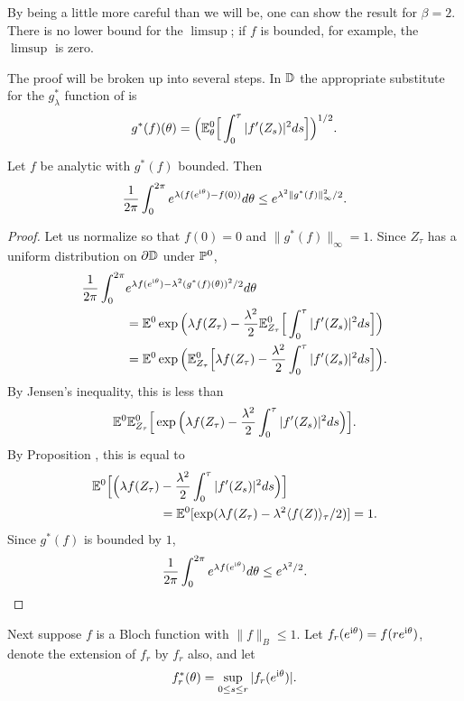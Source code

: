 By being a little more careful than we will be, one can show the result for $\beta = 2$. There is no lower bound for the $\limsup$; if $f$ is bounded, for example, the $\limsup$ is zero.

The proof will be broken up into several steps. In $\D$ the appropriate substitute for the $g_\lambda^*$ function of  is
\[
    g^*(f)(\theta) = \Big(\E_\theta^0\Big[\int_0^\tau |f'(Z_s)|^2 ds\Big]\Big)^{1/2}.
\]

\begin{proposition}\label{prop:ch5_3.11}
Let $f$ be analytic with $g^*(f)$ bounded. Then
\[
    \frac{1}{2\pi}\int_0^{2\pi} e^{\lambda(f(e^{\im\theta})-f(0))} d\theta \leq e^{\lambda^2\|g^*(f)\|_\infty^2/2}.
\]
\end{proposition}

\begin{proof}
Let us normalize so that $f(0) = 0$ and $\|g^*(f)\|_\infty = 1$. Since $Z_\tau$ has a uniform distribution on $\partial\D$ under $\P^0$,
\begin{align*}
    \frac{1}{2\pi}\int_0^{2\pi} &e^{\lambda f(e^{\im\theta})-\lambda^2(g^*(f)(\theta))^2/2} d\theta \\
    &= \E^0\exp\Big(\lambda f(Z_\tau) - \frac{\lambda^2}{2}\E_{Z_\tau}^0\Big[\int_0^\tau |f'(Z_s)|^2 ds\Big]\Big) \\
    &= \E^0\exp\Big(\E_{Z_\tau}^0\Big[\lambda f(Z_\tau) - \frac{\lambda^2}{2}\int_0^\tau |f'(Z_s)|^2 ds\Big]\Big).
\end{align*}
By Jensen's inequality, this is less than
\[
    \E^0\E_{Z_\tau}^0\Big[\exp\Big(\lambda f(Z_\tau) - \frac{\lambda^2}{2}\int_0^\tau |f'(Z_s)|^2 ds\Big)\Big].
\]
By Proposition , this is equal to
\begin{align*}
    \E^0\Big[\Big(\lambda f(Z_\tau) &- \frac{\lambda^2}{2}\int_0^\tau |f'(Z_s)|^2ds\Big)\Big] \\
    &= \E^0[\exp(\lambda f(Z_\tau) - \lambda^2\lrang{f(Z)}_\tau/2)] = 1.
\end{align*}
Since $g^*(f)$ is bounded by $1$,
\[
    \frac{1}{2\pi}\int_0^{2\pi} e^{\lambda f(e^{\im\theta})}d\theta \leq e^{\lambda^2/2}.
\]
\end{proof}

Next suppose $f$ is a Bloch function with $\|f\|_B \leq 1$. Let $f_r(e^{\im\theta}) = f(re^{\im\theta})$, denote the extension of $f_r$ by $f_r$ also, and let
\mpagebreak
\[
    f_r^*(\theta) = \sup_{0\leq s\leq r} |f_r(e^{\im\theta})|.
\]

